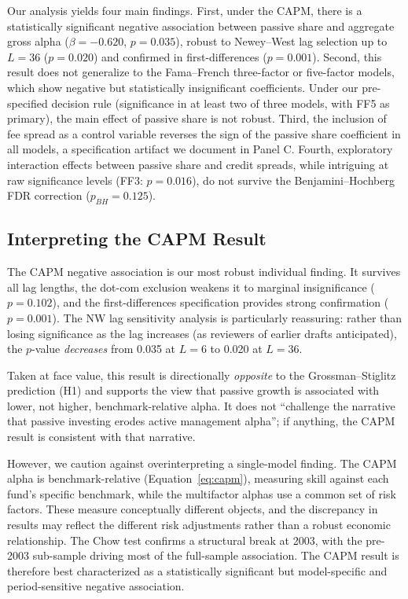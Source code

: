 \documentclass[11pt, a4paper]{article}
\begin{document}
Our analysis yields four main findings. First, under the CAPM, there is a statistically significant negative association between passive share and aggregate gross alpha ($\beta = -0.620$, $p = 0.035$), robust to Newey--West lag selection up to $L = 36$ ($p = 0.020$) and confirmed in first-differences ($p = 0.001$). Second, this result does not generalize to the Fama--French three-factor or five-factor models, which show negative but statistically insignificant coefficients. Under our pre-specified decision rule (significance in at least two of three models, with FF5 as primary), the main effect of passive share is not robust. Third, the inclusion of fee spread as a control variable reverses the sign of the passive share coefficient in all models, a specification artifact we document in Panel C. Fourth, exploratory interaction effects between passive share and credit spreads, while intriguing at raw significance levels (FF3: $p = 0.016$), do not survive the Benjamini--Hochberg FDR correction ($p_{BH} = 0.125$).

\subsection{Interpreting the CAPM Result}

The CAPM negative association is our most robust individual finding. It survives all lag lengths, the dot-com exclusion weakens it to marginal insignificance ($p = 0.102$), and the first-differences specification provides strong confirmation ($p = 0.001$). The NW lag sensitivity analysis is particularly reassuring: rather than losing significance as the lag increases (as reviewers of earlier drafts anticipated), the $p$-value \textit{decreases} from 0.035 at $L = 6$ to 0.020 at $L = 36$.

Taken at face value, this result is directionally \textit{opposite} to the Grossman--Stiglitz prediction (H1) and supports the view that passive growth is associated with lower, not higher, benchmark-relative alpha. It does not ``challenge the narrative that passive investing erodes active management alpha''; if anything, the CAPM result is consistent with that narrative.

However, we caution against overinterpreting a single-model finding. The CAPM alpha is benchmark-relative (Equation~\ref{eq:capm}), measuring skill against each fund's specific benchmark, while the multifactor alphas use a common set of risk factors. These measure conceptually different objects, and the discrepancy in results may reflect the different risk adjustments rather than a robust economic relationship. The Chow test confirms a structural break at 2003, with the pre-2003 sub-sample driving most of the full-sample association. The CAPM result is therefore best characterized as a statistically significant but model-specific and period-sensitive negative association.
\end{document}
